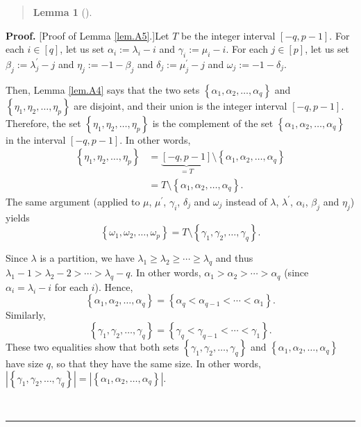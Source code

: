\documentclass[numbers=enddot,12pt,final,onecolumn,notitlepage]{scrartcl}%
\newenvironment{statement}{\begin{quote}}{\end{quote}}
\theoremstyle{definition}
\newtheorem{lem}[theo]{Lemma}
\newenvironment{lemmain}[1][]
{\begin{statement}\begin{lem}[#1]}
{\end{lem}\end{statement}}
\newenvironment{proof}[1][Proof]{\noindent\textbf{#1.} }{\ \rule{0.5em}{0.5em}}
\newenvironment{lemmain}[1][Proof]{\noindent\textbf{#1.} }{\ \rule{0.5em}{0.5em}}
\begin{document}
\begin{enumerate}
\begin{lemmain}
\end{lemmain}

\begin{proof}
[Proof of Lemma \ref{lem.A5}.]Let $T$ be the integer interval $\left[
-q,p-1\right]  $. For each $i\in\left[  q\right]  $, let us set $\alpha
_{i}:=\lambda_{i}-i$ and $\gamma_{i}:=\mu_{i}-i$. For each $j\in\left[
p\right]  $, let us set $\beta_{j}:=\lambda_{j}^{\prime}-j$ and $\eta
_{j}:=-1-\beta_{j}$ and $\delta_{j}:=\mu_{j}^{\prime}-j$ and $\omega
_{j}:=-1-\delta_{j}$.

Then, Lemma \ref{lem.A4} says that the two sets $\left\{  \alpha_{1}%
,\alpha_{2},\ldots,\alpha_{q}\right\}  $ and $\left\{  \eta_{1},\eta
_{2},\ldots,\eta_{p}\right\}  $ are disjoint, and their union is the integer
interval $\left[  -q,p-1\right]  $. Therefore, the set $\left\{  \eta_{1}%
,\eta_{2},\ldots,\eta_{p}\right\}  $ is the complement of the set $\left\{
\alpha_{1},\alpha_{2},\ldots,\alpha_{q}\right\}  $ in the interval $\left[
-q,p-1\right]  $. In other words,%
\begin{align}
\left\{  \eta_{1},\eta_{2},\ldots,\eta_{p}\right\}   &  =\underbrace{\left[
-q,p-1\right]  }_{=T}\setminus\left\{  \alpha_{1},\alpha_{2},\ldots,\alpha
_{q}\right\} \nonumber\\
&  =T\setminus\left\{  \alpha_{1},\alpha_{2},\ldots,\alpha_{q}\right\}  .
\label{p17.lemA5.pf.1}%
\end{align}
The same argument (applied to $\mu$, $\mu^{\prime}$, $\gamma_{i}$, $\delta
_{j}$ and $\omega_{j}$ instead of $\lambda$, $\lambda^{\prime}$, $\alpha_{i}$,
$\beta_{j}$ and $\eta_{j}$) yields%
\begin{equation}
\left\{  \omega_{1},\omega_{2},\ldots,\omega_{p}\right\}  =T\setminus\left\{
\gamma_{1},\gamma_{2},\ldots,\gamma_{q}\right\}  . \label{p17.lemA5.pf.2}%
\end{equation}


Since $\lambda$ is a partition, we have $\lambda_{1}\geq\lambda_{2}\geq
\cdots\geq\lambda_{q}$ and thus $\lambda_{1}-1>\lambda_{2}-2>\cdots
>\lambda_{q}-q$. In other words, $\alpha_{1}>\alpha_{2}>\cdots>\alpha_{q}$
(since $\alpha_{i}=\lambda_{i}-i$ for each $i$). Hence,
\begin{equation}
\left\{  \alpha_{1},\alpha_{2},\ldots,\alpha_{q}\right\}  =\left\{  \alpha
_{q}<\alpha_{q-1}<\cdots<\alpha_{1}\right\}  . \label{p17.lemA5.pf.3a}%
\end{equation}
Similarly,%
\begin{equation}
\left\{  \gamma_{1},\gamma_{2},\ldots,\gamma_{q}\right\}  =\left\{  \gamma
_{q}<\gamma_{q-1}<\cdots<\gamma_{1}\right\}  . \label{p17.lemA5.pf.3b}%
\end{equation}
These two equalities show that both sets $\left\{  \gamma_{1},\gamma
_{2},\ldots,\gamma_{q}\right\}  $ and $\left\{  \alpha_{1},\alpha_{2}%
,\ldots,\alpha_{q}\right\}  $ have size $q$, so that they have the same size.
In other words, $\left\vert \left\{  \gamma_{1},\gamma_{2},\ldots,\gamma
_{q}\right\}  \right\vert =\left\vert \left\{  \alpha_{1},\alpha_{2}%
,\ldots,\alpha_{q}\right\}  \right\vert $.


\end{proof}
\end{enumerate}
\end{document}

